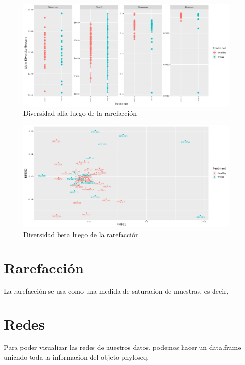 \begin{figure}[!]
\centering
\includegraphics[width=\textwidth]{Img/cap2/Rarefaccion_diversidadAlfa.png}
\caption{Diversidad alfa luego de la rarefacción}
\end{figure}

\begin{figure}[!]
\centering
\includegraphics[width=\textwidth]{Img/cap2/Rarefaccion_diversidadBeta.png}
\caption{Diversidad beta luego de la rarefacción}
\end{figure}

\section{Rarefacción}
La rarefacción se usa como una medida de saturacion de muestras, es decir, 




\section{Redes}





Para poder visualizar las redes de nuestros datos, podemos hacer un data.frame uniendo toda la informacion
del objeto phyloseq.\\

